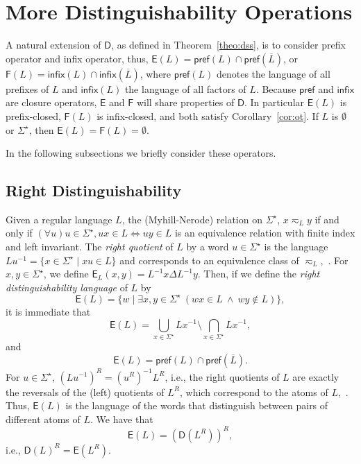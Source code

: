 \documentclass{article}
\newcommand{\comp}[1]{\overline{#1}}
\newcommand{\preff}[1]{\mathsf{pref}(#1)}
\newcommand{\inff}[1]{\mathsf{infix}(#1)}
\newcommand{\preffo}{\mathsf{pref}}
\newcommand{\inffo}{\mathsf{infix}}
\newcommand{\dis}[1]{\mathsf{D}(#1)}
\newcommand{\diso}{\mathsf{D}}
\newcommand{\dpre}[1]{\mathsf{E}(#1)}
\newcommand{\dpreo}{\mathsf{E}}
\newcommand{\dprew}[2]{\mathsf{E}_{#1}(#2)}
\newcommand{\dinf}[1]{\mathsf{F}(#1)}
\newcommand{\dinfo}{\mathsf{F}}
\newcommand{\mnleq}[1]{\eqsim_{#1}}
\newcommand{\kleene}[1]{#1^\star}
\begin{document}
\section{More Distinguishability Operations}
\label{sec:otherdis}
A natural extension of $\diso$, as defined in Theorem~\ref{theo:dss}, is to consider prefix operator and infix operator, thus,
$\dpre{L}=\preff{L}\cap\preff{\comp{L}}$, or
$\dinf{L}=\inff{L}\cap\inff{\comp{L}}$, where $\preff{L}$ denotes the language of all prefixes of $L$ and $\inff{L}$ the language of all factors of $L$.
Because $\preffo$ and $\inffo$ are closure operators, $\dpreo$ and $\dinfo$  will share properties of  $\diso$. In particular $\dpre{L}$ is prefix-closed, $\dinf{L}$ is infix-closed, and both satisfy Corollary~\ref{cor:ot}. If $L$ is $\emptyset$ or $\Sigma^\star$, then $\dpre{L}=\dinf{L}=\emptyset$.




In the following subsections we briefly consider these operators.

\subsection{Right Distinguishability}
\label{sec:rightdis}
Given a regular language $L$, the (Myhill-Nerode) relation on $\Sigma^\star$, $x\mnleq{L} y$ if and only if $(\forall u)u\in \Sigma^\star, ux\in L \Leftrightarrow uy\in L$ is an equivalence relation with finite index and  left invariant. The \emph{right quotient} of $L$ by a word $u\in \Sigma^\star$ is the language $Lu^{-1}=\{x\in \Sigma^\star \mid xu \in L\}$ and corresponds to an equivalence class of $\mnleq{L}$,~\cite{champarnaud13:_two_sided_deriv_for_regul,sakarovitch09:_elemen_of_autom_theor}.
For $x,y\in \Sigma^\star$, we define $\dprew{L}{x,y} = L^{-1}x\Delta L^{-1}y$. Then, if we define
the \emph{right distinguishability language} of $L$ by 
\begin{equation}
\label{eq:disleftR}
\dpre{L}=\{w\mid \exists x,y\in \Sigma^\star \ (wx \in L\ \wedge \ wy
\notin L)\},
\end{equation}
\noindent it is immediate that 
\begin{equation*}
 \dpre{L} = \bigcup_{x\in\kleene{\Sigma}}Lx^{-1}\setminus
 \bigcap_{x\in\kleene{\Sigma}}Lx^{-1}, 
\end{equation*}
and
\begin{equation*}
 \dpre{L}=\preff{L}\cap\preff{\comp{L}}.
 \end{equation*}
For $u\in \Sigma^\star$, $(Lu^{-1})^R=(u^R)^{-1}L^R$, i.e., the right quotients of $L$ are exactly the reversals of the (left) quotients of $L^R$, which  correspond to  the atoms of $L$,~\cite{brzozowski11:_theor_of_atomat}. Thus, $\dpre{L}$ is the language of the words that distinguish between pairs of different atoms  of $L$.
We have that 
\begin{equation}
\label{eq:dpredis}
\dpre{L}=(\dis{L^R})^R,
\end{equation}
i.e., $\dis{L}^R=\dpre{L^R}$. 
\end{document}
